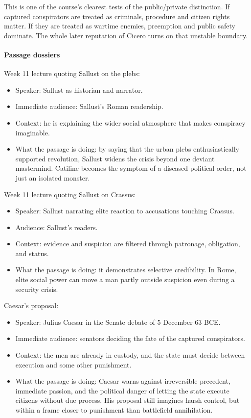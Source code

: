 \documentclass[11pt]{article}
\begin{document}
This is one of the course's clearest tests of the public/private distinction. If captured conspirators are treated as criminals, procedure and citizen rights matter. If they are treated as wartime enemies, preemption and public safety dominate. The whole later reputation of Cicero turns on that unstable boundary.

\paragraph{Passage dossiers}

Week 11 lecture quoting Sallust on the plebs:

\begin{itemize}
\item Speaker: Sallust as historian and narrator.
\item Immediate audience: Sallust's Roman readership.
\item Context: he is explaining the wider social atmosphere that makes conspiracy imaginable.
\item What the passage is doing: by saying that the urban plebs enthusiastically supported revolution, Sallust widens the crisis beyond one deviant mastermind. Catiline becomes the symptom of a diseased political order, not just an isolated monster.
\end{itemize}

Week 11 lecture quoting Sallust on Crassus:

\begin{itemize}
\item Speaker: Sallust narrating elite reaction to accusations touching Crassus.
\item Audience: Sallust's readers.
\item Context: evidence and suspicion are filtered through patronage, obligation, and status.
\item What the passage is doing: it demonstrates selective credibility. In Rome, elite social power can move a man partly outside suspicion even during a security crisis.
\end{itemize}

Caesar's proposal:

\begin{itemize}
\item Speaker: Julius Caesar in the Senate debate of 5 December 63 BCE.
\item Immediate audience: senators deciding the fate of the captured conspirators.
\item Context: the men are already in custody, and the state must decide between execution and some other punishment.
\item What the passage is doing: Caesar warns against irreversible precedent, immediate passion, and the political danger of letting the state execute citizens without due process. His proposal still imagines harsh control, but within a frame closer to punishment than battlefield annihilation.
\end{itemize}
\end{document}
